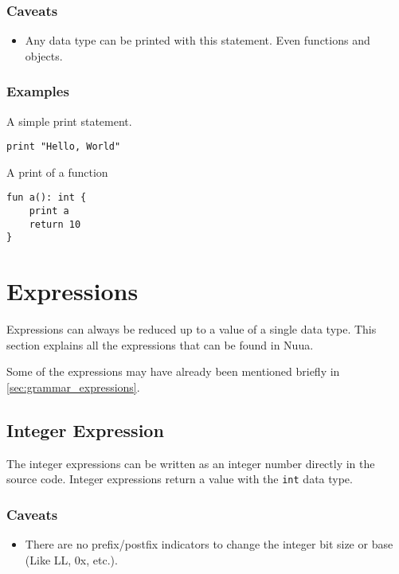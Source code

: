 \subsubsection{Caveats}

\begin{itemize}
    \item Any data type can be printed with this statement. Even functions and objects.
\end{itemize}

\subsubsection{Examples}

A simple print statement.
\begin{verbatim}
print "Hello, World"
\end{verbatim}
A print of a function
\begin{verbatim}
fun a(): int {
    print a
    return 10
}
\end{verbatim}

\section{Expressions}
\label{sec:expressions}

Expressions can always be reduced up to a value of a single data type. This section explains all the expressions that can be found
in Nuua.

Some of the expressions may have already been mentioned briefly in \autoref{sec:grammar_expressions}.

\subsection{Integer Expression}

The integer expressions can be written as an integer number directly in the source code.
Integer expressions return a value with the \texttt{int} data type.

\subsubsection{Caveats}

\begin{itemize}
    \item There are no prefix/postfix indicators to change the integer bit size or base (Like LL, 0x, etc.).
\end{itemize}

